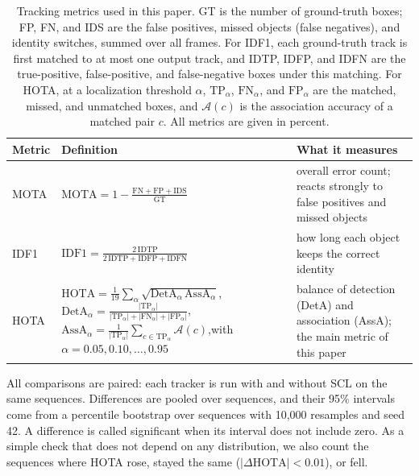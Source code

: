 \documentclass[pdflatex,sn-mathphys-num,iicol]{sn-jnl}
\newcommand{\scl}{SCL}
\begin{document}
\begin{table}[t]
\caption{Tracking metrics used in this paper. GT is the number of
ground-truth boxes; FP, FN, and IDS are the false positives, missed objects
(false negatives), and identity switches, summed over all frames. For IDF1,
each ground-truth track is first matched to at most one output track, and
IDTP, IDFP, and IDFN are the true-positive, false-positive, and
false-negative boxes under this matching. For HOTA, at a localization
threshold $\alpha$, $\mathrm{TP}_\alpha$, $\mathrm{FN}_\alpha$, and
$\mathrm{FP}_\alpha$ are the matched, missed, and unmatched boxes, and
$\mathcal{A}(c)$ is the association accuracy of a matched pair $c$. All
metrics are given in percent.}
\label{tab:metrics}
\centering\footnotesize
\setlength{\tabcolsep}{4pt}
\renewcommand{\arraystretch}{1.6}
\begin{tabular}{@{}l>{\raggedright\arraybackslash}p{78mm}>{\raggedright\arraybackslash}p{58mm}@{}}
\toprule
Metric & Definition & What it measures\\
\midrule
MOTA \cite{bernardin2008clear} & $\displaystyle \mathrm{MOTA}=1-\frac{\mathrm{FN}+\mathrm{FP}+\mathrm{IDS}}{\mathrm{GT}}$ & overall error count; reacts strongly to false positives and missed objects\\
IDF1 \cite{ristani2016idf1} & $\displaystyle \mathrm{IDF1}=\frac{2\,\mathrm{IDTP}}{2\,\mathrm{IDTP}+\mathrm{IDFP}+\mathrm{IDFN}}$ & how long each object keeps the correct identity\\
HOTA \cite{luiten2021hota} & $\displaystyle \mathrm{HOTA}=\frac{1}{19}\sum_{\alpha}\sqrt{\mathrm{DetA}_\alpha\,\mathrm{AssA}_\alpha}$,\newline $\displaystyle \mathrm{DetA}_\alpha=\frac{|\mathrm{TP}_\alpha|}{|\mathrm{TP}_\alpha|+|\mathrm{FN}_\alpha|+|\mathrm{FP}_\alpha|}$,\quad $\displaystyle \mathrm{AssA}_\alpha=\frac{1}{|\mathrm{TP}_\alpha|}\sum_{c\in\mathrm{TP}_\alpha}\mathcal{A}(c)$,\newline with $\alpha=0.05,0.10,\dots,0.95$ & balance of detection (DetA) and association (AssA); the main metric of this paper\\
\bottomrule
\end{tabular}
\end{table}

All comparisons are paired: each tracker is run with and without \scl{} on
the same sequences. Differences are pooled over sequences, and their 95\%
intervals come from a percentile bootstrap over sequences
\cite{efron1993bootstrap} with 10,000 resamples and seed 42. A difference is
called significant when its interval does not include zero. As a simple
check that does not depend on any distribution, we also count the sequences
where HOTA rose, stayed the same ($|\Delta\mathrm{HOTA}|<0.01$), or fell.
\end{document}
